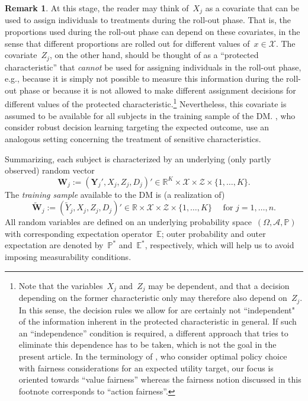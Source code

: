 \documentclass[11pt, a4paper]{article}
\newcommand{\R}{\mathbb{R}}
\theoremstyle{definition}
\newtheorem{remark}{Remark}[section]
\begin{document}
\begin{remark}\label{rem:covintpt}
At this stage, the reader may think of~$X_j$ as a covariate that can be used to assign individuals to treatments during the roll-out phase. That is, the proportions used during the roll-out phase can depend on these covariates, in the sense that different proportions are rolled out for different values of~$x \in \mathcal{X}$. The covariate~$Z_j$, on the other hand, should be thought of as a ``protected characteristic'' that \emph{cannot} be used for assigning individuals in the roll-out phase, e.g., because it is simply not possible to measure this information during the roll-out phase or because it is not allowed to make different assignment decisions for different values of the protected characteristic.\footnote{Note that the variables~$X_j$ and~$Z_j$ may be dependent, and that a decision depending on the former characteristic only may therefore also depend on~$Z_j$. In this sense, the decision rules we allow for are certainly not ``independent" of the information inherent in the protected characteristic in general. If such an ``independence'' condition is required, a different approach that tries to eliminate this dependence has to be taken, which is not the goal in the present article. In the terminology of \cite{frauen2023fair}, who consider optimal policy choice with fairness considerations for an expected utility target, our focus is oriented towards ``value fairness'' whereas the fairness notion discussed in this footnote corresponds to ``action fairness''.} Nevertheless, this covariate is assumed to be available for all subjects in the training sample of the DM. \cite{tan2022rise}, who consider robust decision learning targeting the expected outcome, use an analogous setting concerning the treatment of sensitive characteristics.
\end{remark}

Summarizing, each subject is characterized by an underlying (only partly observed) random vector
\begin{equation*}
\bm{W}_j := \left(\bm{Y}_j', X_j, Z_j, D_j\right)' \in \R^{K} \times \mathcal{X} \times \mathcal{Z} \times \{1, \hdots, K\}.
\end{equation*}
%
The \emph{training sample} available to the DM is (a realization of)
%
\begin{equation}\label{eqn:obs}
\tilde{\bm{W}}_j := \left(\tilde{Y}_j, X_j, Z_j, D_j\right)' \in \R \times  \mathcal{X} \times \mathcal{Z} \times \{1, \hdots, K\} \quad \text{ for } j = 1, \hdots, n.
\end{equation}
%
All random variables are defined on an underlying probability space~$(\Omega, \mathcal{A}, \mathbb{P})$ with corresponding expectation operator~$\mathbb{E}$; outer probability and outer expectation are denoted by~$\mathbb{P}^*$ and~$\mathbb{E}^*$, respectively, which will help us to avoid imposing measurability conditions.
\end{document}
